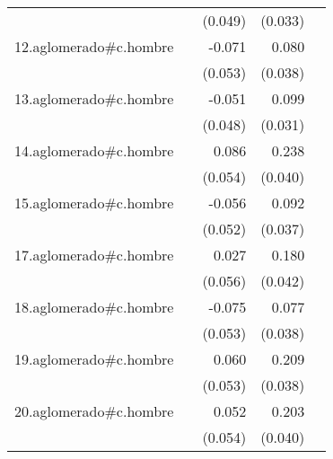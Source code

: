 {\begin{longtable}{l*{4}{D{.}{.}{-1}}}
            &                     &     (0.049)         &     (0.033)         &                     \\
\addlinespace
12.aglomerado#c.hombre&                     &      -0.071         &       0.080\sym{*}  &                     \\
            &                     &     (0.053)         &     (0.038)         &                     \\
\addlinespace
13.aglomerado#c.hombre&                     &      -0.051         &       0.099\sym{**} &                     \\
            &                     &     (0.048)         &     (0.031)         &                     \\
\addlinespace
14.aglomerado#c.hombre&                     &       0.086         &       0.238\sym{***}&                     \\
            &                     &     (0.054)         &     (0.040)         &                     \\
\addlinespace
15.aglomerado#c.hombre&                     &      -0.056         &       0.092\sym{*}  &                     \\
            &                     &     (0.052)         &     (0.037)         &                     \\
\addlinespace
17.aglomerado#c.hombre&                     &       0.027         &       0.180\sym{***}&                     \\
            &                     &     (0.056)         &     (0.042)         &                     \\
\addlinespace
18.aglomerado#c.hombre&                     &      -0.075         &       0.077\sym{*}  &                     \\
            &                     &     (0.053)         &     (0.038)         &                     \\
\addlinespace
19.aglomerado#c.hombre&                     &       0.060         &       0.209\sym{***}&                     \\
            &                     &     (0.053)         &     (0.038)         &                     \\
\addlinespace
20.aglomerado#c.hombre&                     &       0.052         &       0.203\sym{***}&                     \\
            &                     &     (0.054)         &     (0.040)         &                     \\

\end{longtable}}
